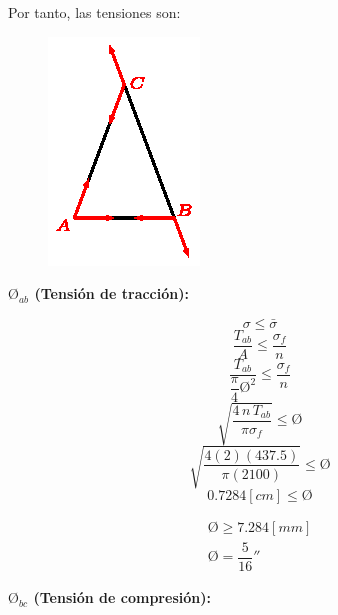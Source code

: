 \documentclass[letter,10pt,twoside]{article}
\begin{document}
Por tanto, las tensiones son:

\begin{figure}[H]
\centering
\includegraphics[scale=1.8]{resources/x0404.eps}
\end{figure}

\textbf{$\text{\O}_{ab}$ (Tensión de tracción):}

\begin{equation*}
    \sigma \le \bar{\sigma}
\end{equation*}
\begin{equation*}
    \frac{T_{ab}}{A} \le \frac{\sigma_f}{n}
\end{equation*}
\begin{equation*}
    \frac{T_{ab}}{\dfrac{\pi}{4} \text{\O}^2} \le \frac{\sigma_f}{n}
\end{equation*}
\begin{equation*}
    \sqrt{\frac{4\,n\,T_{ab}}{\pi\sigma_f}} \le \text{\O}
\end{equation*}
\begin{equation*}
    \sqrt{\frac{4(2)(437.5)}{\pi(2100)}} \le \text{\O}
\end{equation*}
\begin{equation*}
    0.7284[cm] \le \text{\O}
\end{equation*}

\begin{equation*}
\boxed{
    \begin{array}{l}
        \text{\O} \ge 7.284[mm] \\
        \text{\O} = \dfrac{5}{16}''
    \end{array}
}
\end{equation*}

\textbf{$\text{\O}_{bc}$ (Tensión de compresión):}
\end{document}
